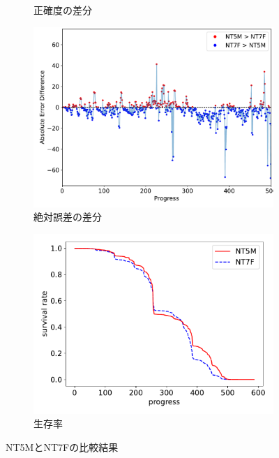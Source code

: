 \begin{figure}[t]
\begin{subfigure}[b]{0.49\linewidth}
    \caption{正確度の差分}
    \label{fig:NT5M_and_NT7F_acc_diff}
\end{subfigure}
\begin{subfigure}[b]{0.49\linewidth}
    \includegraphics[width=\linewidth]{pdf/compare/NT5M_and_NT7F/error_abs_diff_plot.pdf}
    \caption{絶対誤差の差分}
    \label{fig:NT5M_and_NT7F_error_abs_diff}
\end{subfigure}
\begin{subfigure}[b]{0.49\linewidth}
    \includegraphics[width=\linewidth]{pdf/compare/NT5M_and_NT7F/survival.pdf}
    \caption{生存率}
    \label{fig:NT5M_and_NT7F_survival}
\end{subfigure}
\caption{NT5MとNT7Fの比較結果}
\label{fig:NT5M_and_NT7F_results}
\end{figure}

